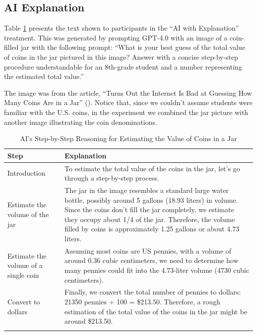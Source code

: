 \documentclass[
  11pt,
]{article}
\begin{document}
\subsection{AI Explanation}\label{sec:si-ai-explanation}

Table \ref{tab:explanation} presents the text shown to participants in the ``AI with Explanation'' treatment. This was generated by prompting GPT-4.0 with an image of a coin-filled jar with the following prompt: ``What is your best guess of the total value of coins in the jar pictured in this image? Answer with a concise step-by-step procedure understandable for an 8th-grade student and a number representing the estimated total value.''

The image was from the article, ``Turns Out the Internet Is Bad at Guessing How Many Coins Are in a Jar'' (). Notice that, since we couldn't assume students were familiar with the U.S. coins, in the experiment we combined the jar picture with another image illustrating the coin denominations.

\begin{table}

\caption{\label{tab:explanation}AI's Step-by-Step Reasoning for Estimating the Value of Coins in a Jar}
\centering
\begin{tabular}[t]{l>{\raggedright\arraybackslash}p{4in}}
\toprule
Step & Explanation\\
\midrule\arrayrulecolor{gray!20}
Introduction & To estimate the total value of the coins in the jar, let's go through a step-by-step process.\\
Estimate the volume of the jar & The jar in the image resembles a standard large water bottle, possibly around 5 gallons (18.93 liters) in volume. Since the coins don't fill the jar completely, we estimate they occupy about 1/4 of the jar. Therefore, the volume filled by coins is approximately 1.25 gallons or about 4.73 liters.\\
Estimate the volume of a single coin & Assuming most coins are US pennies, with a volume of around 0.36 cubic centimeters, we need to determine how many pennies could fit into the 4.73-liter volume (4730 cubic centimeters).\\
Convert to dollars & Finally, we convert the total number of pennies to dollars: 21350 pennies ÷ 100 = \$213.50. Therefore, a rough estimation of the total value of the coins in the jar might be around \$213.50.\\
\arrayrulecolor{black}\bottomrule
\end{tabular}
\end{table}
\newpage
\end{document}
